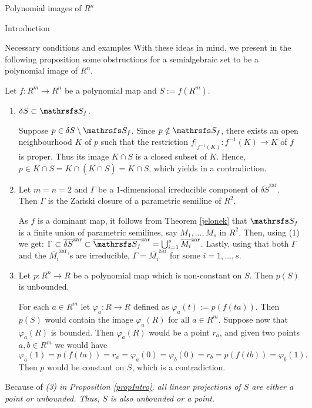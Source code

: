 \documentclass[11pt, a4paper, english, twoside, notitlepage, openright]{report}
\begin{document}
\begin{chapter}{Polynomial images of $R^n$}
\begin{section}{Introduction}
\begin{subsection}{Necessary conditions and examples}
With these ideas in mind, we present in the following proposition some obstructions for a semialgebraic set to be a polynomial image of $R^n$. 
\begin{proposition}\label{propIntro} Let $f: R^m\to R^n$ be a polynomial map and $S:=f(R^m)$.
\begin{enumerate}[\em(1)\em]
\item $\delta S \subset\S_f$.
\begin{Proof} Suppose $p\in\delta S\setminus \S_f$. Since $p\notin\S_f$, there exists an open neighbourhood $K$ of $p$ such that the restriction $f|_{f^{-1}(K)}:f^{-1}(K)\to K$ of $f$ is proper. Thus its image $K\cap S$ is a closed subset of $K$. Hence, $p\in K\cap\overline{S}=K\cap(\overline{K\cap S})=K\cap S$, which yields in a contradiction.
\end{Proof}
\item Let $m=n=2$ and $\Gamma$ be a $1$-dimensional irreducible component of $\overline{\delta S}^{\text{zar}}$. Then $\Gamma$ is the Zariski closure of a parametric semiline of $R^2$.
\begin{Proof} As $f$ is a dominant map, it follows from Theorem \ref{jelonek} that $\S_f$ is a finite union of parametric semilines, say $M_1,\dots, M_s$ in $R^2$. Then, using (1) we get: $\Gamma\subset\overline{\delta S}^{\text{zar}}\subset \overline{\S_f}^{\text{zar}}=\bigcup_{i=1}^s\overline{M_i}^{\text{zar}}$. Lastly, using that both $\Gamma$ and the $\overline{M_i}^{\text{zar}}$'s are irreducible, $\Gamma=\overline{M_i}^{\text{zar}}$ for some $i=1,\dots,s$.
\end{Proof}
\item Let $p:R^n\to R$ be a polynomial map which is non-constant on $S$. Then $p(S)$ is unbounded.
\begin{Proof} For each $a \in R^m$ let $\varphi_a:R\to R$ defined as $\varphi_a(t):=p(f(ta))$. Then $p(S)$ would contain the image $\varphi_a(R)$ for all $a\in R^m$. Suppose now that $\varphi_a(R)$ is bounded. Then $\varphi_a(R)$ would be a point $r_a$, and given two points $a,b\in R^m$ we would have
$$ 
\varphi_a(1)=p(f(ta))=r_a=\varphi_a(0)=\varphi_b(0)=r_b=p(f(tb))=\varphi_b(1).
$$ 
Then $p$ would be constant on $S$, which is a contradiction.
\end{Proof}
\end{enumerate}
\end{proposition}	
\begin{corollary} Because of \em (3) \em in Proposition \em \ref{propIntro}, \em all linear projections of $S$ are either a point or unbounded. Thus, $S$ is also unbounded or a point.
\end{corollary}
	

\end{subsection}
\end{section}
\end{chapter}
\end{document}
